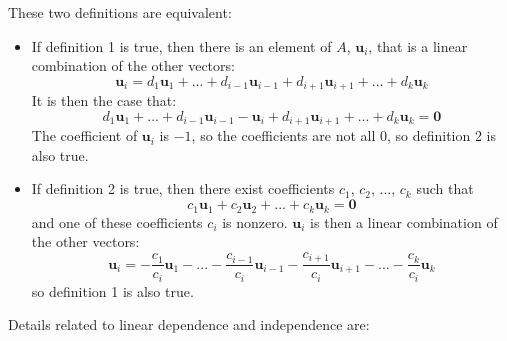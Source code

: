 \documentclass{article}
\begin{document}
\vspace{5mm}

These two definitions are equivalent: 
\begin{itemize}
\item If definition 1 is true, then there is an element of \(A\), \(\mathbf{u}_ i\), that is a linear combination of the other vectors: 
\[\mathbf{u}_i = d_1\mathbf{u}_1 + ... + d_{i-1}\mathbf{u}_{i-1} + d_{i+1}\mathbf{u}_{i+1} + ... + d_k\mathbf{u}_k\] 
It is then the case that:
\[d_1\mathbf{u}_1 + ... + d_{i-1}\mathbf{u}_{i-1} - \mathbf{u}_i + d_{i+1}\mathbf{u}_{i+1} + ... + d_k\mathbf{u}_k = \mathbf{0}\] 
The coefficient of \(\mathbf{u}_i\) is \(-1\), so the coefficients are not all \(0\), so  definition 2 is also true. 
\item If definition 2 is true, then there exist coefficients \(c_1\), \(c_2\), ..., \(c_k\) such that 
\[c_1 \mathbf{u}_1 + c_2 \mathbf{u}_2 + ... + c_k \mathbf{u}_k = \mathbf{0}\] 
and one of these coefficients \(c_i\) is nonzero. \(\mathbf{u}_i\) is then a linear combination of the other vectors: 
\[\mathbf{u}_i = -\frac{c_1}{c_i}\mathbf{u}_1 - ... - \frac{c_{i-1}}{c_i}\mathbf{u}_{i-1} - \frac{c_{i+1}}{c_i}\mathbf{u}_{i+1} - ... - \frac{c_k}{c_i}\mathbf{u}_k\] 
so definition 1 is also true.  
\end{itemize}

\vspace{5mm}

Details related to linear dependence and independence are:
\end{document}
